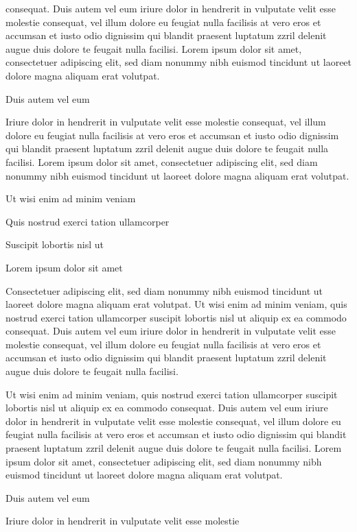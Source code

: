 \documentclass[11pt,twoside]{article}\makeatletter
\begin{document}
      consequat. Duis autem vel eum iriure dolor in hendrerit in vulputate
      velit esse molestie consequat, vel illum dolore eu feugiat nulla
      facilisis at vero eros et accumsan et iusto odio dignissim qui blandit
      praesent luptatum zzril delenit augue duis dolore te feugait nulla
      facilisi. Lorem ipsum dolor sit amet, consectetuer adipiscing elit,
      sed diam nonummy nibh euismod tincidunt ut laoreet dolore magna
      aliquam erat volutpat. \par Duis autem vel eum \par Iriure dolor in hendrerit in vulputate velit esse molestie
      consequat, vel illum dolore eu feugiat nulla facilisis at vero eros et
      accumsan et iusto odio dignissim qui blandit praesent luptatum zzril
      delenit augue duis dolore te feugait nulla facilisi. Lorem ipsum dolor
      sit amet, consectetuer adipiscing elit, sed diam nonummy nibh euismod
      tincidunt ut laoreet dolore magna aliquam erat volutpat. \par Ut wisi enim ad minim veniam\par Quis nostrud exerci tation ullamcorper \par Suscipit lobortis nisl ut \par Lorem ipsum dolor sit amet\par Consectetuer adipiscing elit, sed diam nonummy nibh euismod
      tincidunt ut laoreet dolore magna aliquam erat volutpat. Ut wisi enim
      ad minim veniam, quis nostrud exerci tation ullamcorper suscipit
      lobortis nisl ut aliquip ex ea commodo consequat. Duis autem vel eum
      iriure dolor in hendrerit in vulputate velit esse molestie consequat,
      vel illum dolore eu feugiat nulla facilisis at vero eros et accumsan
      et iusto odio dignissim qui blandit praesent luptatum zzril delenit
      augue duis dolore te feugait nulla facilisi.\par Ut wisi enim ad minim veniam, quis nostrud exerci tation
      ullamcorper suscipit lobortis nisl ut aliquip ex ea commodo
      consequat. Duis autem vel eum iriure dolor in hendrerit in vulputate
      velit esse molestie consequat, vel illum dolore eu feugiat nulla
      facilisis at vero eros et accumsan et iusto odio dignissim qui blandit
      praesent luptatum zzril delenit augue duis dolore te feugait nulla
      facilisi. Lorem ipsum dolor sit amet, consectetuer adipiscing elit,
      sed diam nonummy nibh euismod tincidunt ut laoreet dolore magna
      aliquam erat volutpat. \par Duis autem vel eum \par Iriure dolor in hendrerit in vulputate velit esse molestie
\end{document}
